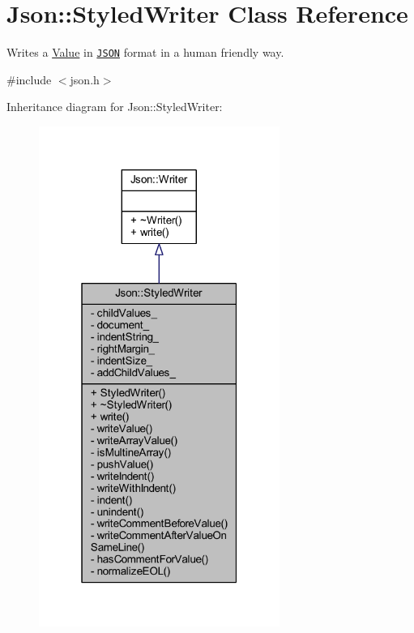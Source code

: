 \hypertarget{class_json_1_1_styled_writer}{}\section{Json\+:\+:Styled\+Writer Class Reference}
\label{class_json_1_1_styled_writer}


Writes a \hyperlink{class_json_1_1_value}{Value} in \href{http://www.json.org}{\tt J\+S\+ON} format in a human friendly way.  




{\ttfamily \#include $<$json.\+h$>$}



Inheritance diagram for Json\+:\+:Styled\+Writer\+:\nopagebreak
\begin{figure}[H]
\begin{center}
\leavevmode
\includegraphics[width=223pt]{class_json_1_1_styled_writer__inherit__graph}
\end{center}
\end{figure}


